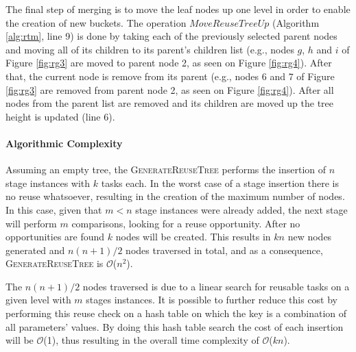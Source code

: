 




The final step of merging is to move the leaf nodes up one level in order to enable the creation of new buckets. The operation $MoveReuseTreeUp$ (Algorithm \ref{alg:rtm}, line 9) is done by taking each of the previously selected parent nodes and moving all of its children to its parent's children list (e.g., nodes $g$, $h$ and $i$ of Figure \ref{fig:rg3} are moved to parent node 2, as seen on Figure \ref{fig:rg4}). After that, the current node is remove from its parent (e.g., nodes 6 and 7 of Figure \ref{fig:rg3} are removed from parent node 2, as seen on Figure \ref{fig:rg4}). After all nodes from the parent list are removed and its children are moved up the tree height is updated (line 6).

\paragraph{Algorithmic Complexity}

Assuming an empty tree, the {\scshape GenerateReuseTree} performs the insertion of $n$ stage instances with $k$ tasks each. In the worst case of a stage insertion there is no reuse whatsoever, resulting in the creation of the maximum number of nodes. In this case, given that $m<n$ stage instances were already added, the next stage will perform $m$ comparisons, looking for a reuse opportunity. After no opportunities are found $k$ nodes will be created. This results in $kn$ new nodes generated and $n(n+1)/2$ nodes traversed in total, and as a consequence, {\scshape GenerateReuseTree} is $\mathcal{O}$($n^2$).

The $n(n+1)/2$ nodes traversed is due to a linear search for reusable tasks on a given level with $m$ stages instances. It is possible to further reduce this cost by performing this reuse check on a hash table on which the key is a combination of all parameters' values. By doing this hash table search the cost of each insertion will be $\mathcal{O}$(1), thus resulting in the overall time complexity of $\mathcal{O}$($kn$).

